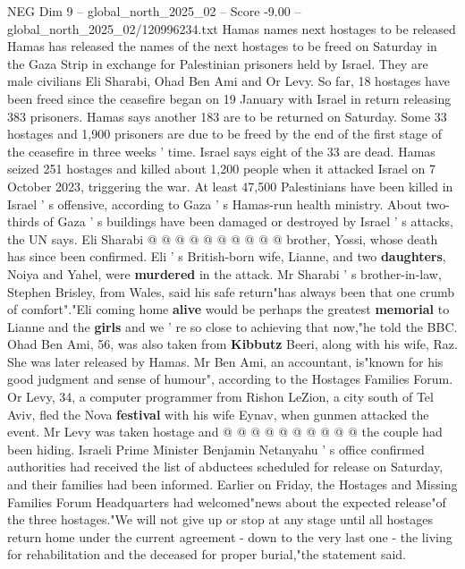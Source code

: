 \begin{textsample}{NEG Dim 9 – global\_north\_2025\_02 – Score -9.00 – global\_north\_2025\_02/120996234.txt}  \label{ex:f9_neg_058}
Hamas names next hostages to be released Hamas has released the names of the next hostages to be freed on Saturday in the Gaza Strip in exchange for Palestinian prisoners held by Israel.
They are male civilians Eli Sharabi, Ohad Ben Ami and Or Levy.
So far, 18 hostages have been freed since the ceasefire began on 19 January with Israel in return releasing 383 prisoners.
Hamas says another 183 are to be returned on Saturday.
Some 33 hostages and 1,900 prisoners are due to be freed by the end of the first stage of the ceasefire in three weeks ' time.
Israel says eight of the 33 are dead.
Hamas seized 251 hostages and killed about 1,200 people when it attacked Israel on 7 October 2023, triggering the war.
At least 47,500 Palestinians have been killed in Israel ' s offensive, according to Gaza ' s Hamas-run health ministry.
About two-thirds of Gaza ' s buildings have been damaged or destroyed by Israel ' s attacks, the UN says.
Eli Sharabi @ @ @ @ @ @ @ @ @ @ brother, Yossi, whose death has since been confirmed.
Eli ' s British-born wife, Lianne, and two \textbf{daughters}, Noiya and Yahel, were \textbf{murdered} in the attack.
Mr Sharabi ' s brother-in-law, Stephen Brisley, from Wales, said his safe return"has always been that one crumb of comfort"."Eli coming home \textbf{alive} would be perhaps the greatest \textbf{memorial} to Lianne and the \textbf{girls} and we ' re so close to achieving that now,"he told the BBC.
Ohad Ben Ami, 56, was also taken from \textbf{Kibbutz} Beeri, along with his wife, Raz.
She was later released by Hamas.
Mr Ben Ami, an accountant, is"known for his good judgment and sense of humour", according to the Hostages Families Forum.
Or Levy, 34, a computer programmer from Rishon LeZion, a city south of Tel Aviv, fled the Nova \textbf{festival} with his wife Eynav, when gunmen attacked the event.
Mr Levy was taken hostage and @ @ @ @ @ @ @ @ @ @ the couple had been hiding.
Israeli Prime Minister Benjamin Netanyahu ' s office confirmed authorities had received the list of abductees scheduled for release on Saturday, and their families had been informed.
Earlier on Friday, the Hostages and Missing Families Forum Headquarters had welcomed"news about the expected release"of the three hostages."We will not give up or stop at any stage until all hostages return home under the current agreement - down to the very last one - the living for rehabilitation and the deceased for proper burial,"the statement said.

\end{textsample}
